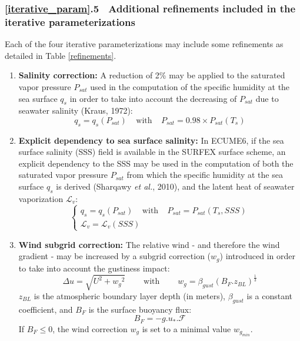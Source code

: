 \vspace*{0.2 cm}


\subsubsection{\ref{iterative_param}.5 $~$ Additional refinements included in the iterative parameterizations}

Each of the four iterative parameterizations may include some refinements as detailed in Table \ref{refinements}.
\begin{enumerate}

	\item \textbf{Salinity correction:} 
A reduction of 2\% may be applied to the saturated vapor pressure $P_{\mathit{sat}}$ used in the computation 
of the specific humidity at the sea surface $q_s$ in order to take into account the decreasing of $P_{\mathit{sat}}$
due to seawater salinity (Kraus, 1972)\nocite{kraus1972}:  
\begin{equation}
	q_{s}=q_{s}(P_{\mathit{sat}})~~~~~\mathrm{with}~~~~~P_{\mathit{sat}}=0.98\times P_{\mathit{sat}}(T_{s})
\end{equation}

	\item \textbf{Explicit dependency to sea surface salinity:}
In ECUME6, if the sea surface salinity (SSS) field is available in the SURFEX surface scheme, an explicit dependency to the SSS
may be used in the computation of both the saturated vapor pressure $P_{\mathit{sat}}$ from which the specific humidity at 
the sea surface $q_s$ is derived (Sharqawy \textit{et al.}, 2010), %
and the latent heat of seawater vaporization ${\mathcal{L}}_{v}$:
$$
\left\{
\begin{array}{l}
	q_{s}=q_{s}(P_{\mathit{sat}})~~~~~\mathrm{with}~~~~~P_{\mathit{sat}}=P_{\mathit{sat}}(T_{s},SSS)\\
	{\mathcal{L}}_{v}={\mathcal{L}}_{v}(\mathit{SSS})
\end{array}
\right.
$$

	\item \textbf{Wind subgrid correction:}
The relative wind - and therefore the wind gradient - may be increased by a subgrid correction ($w_g$) introduced in order to 
take into account the gustiness impact:
\begin{equation}
	\Delta u=\sqrt{U^2+{w_g}^2}~~~~~~~~~~\mathrm{with}~~~~~~~~~~w_g={\beta}_{\mathit{gust}}({B_F}.z_{\mathit{BL}})^{\frac{1}{3}}
\end{equation}
$z_{\mathit{BL}}$ is the atmospheric boundary layer depth (in meters), ${\beta}_{\mathit{gust}}$ is a constant coefficient,
and ${B_F}$ is the surface buoyancy flux:
		$${B_F}=-g.u_*.\mathcal{F}$$
If $B_F \leq$0, the wind correction $w_g$ is set to a minimal value $w_{g_{\mathit{min}}}$.


\end{enumerate}
